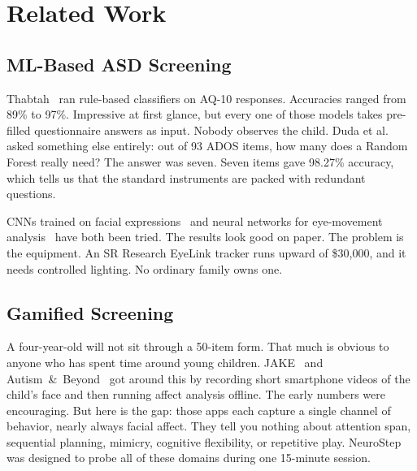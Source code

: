 \documentclass[conference]{IEEEtran}
\begin{document}
\section{Related Work}

\subsection{ML-Based ASD Screening}
Thabtah~\cite{thabtah2019ml} ran rule-based classifiers on AQ-10 responses. Accuracies ranged from 89\% to 97\%. Impressive at first glance, but every one of those models takes pre-filled questionnaire answers as input. Nobody observes the child. Duda et al.~\cite{duda2016clinical} asked something else entirely: out of 93 ADOS items, how many does a Random Forest really need? The answer was seven. Seven items gave 98.27\% accuracy, which tells us that the standard instruments are packed with redundant questions.

CNNs trained on facial expressions~\cite{li2019facial} and neural networks for eye-movement analysis~\cite{wang2019autism} have both been tried. The results look good on paper. The problem is the equipment. An SR Research EyeLink tracker runs upward of \$30,000, and it needs controlled lighting. No ordinary family owns one.

\subsection{Gamified Screening}
A four-year-old will not sit through a 50-item form. That much is obvious to anyone who has spent time around young children. JAKE~\cite{murias2018jake} and Autism~\&~Beyond~\cite{dawson2018autismbeyond} got around this by recording short smartphone videos of the child's face and then running affect analysis offline. The early numbers were encouraging. But here is the gap: those apps each capture a single channel of behavior, nearly always facial affect. They tell you nothing about attention span, sequential planning, mimicry, cognitive flexibility, or repetitive play. NeuroStep was designed to probe all of these domains during one 15-minute session.
\end{document}
